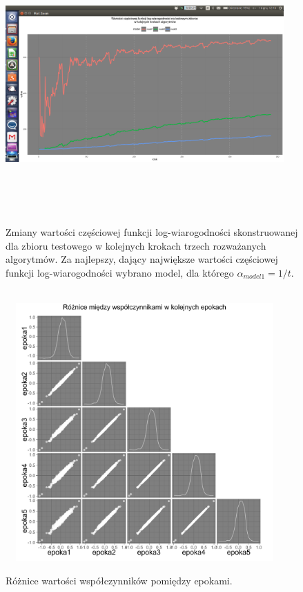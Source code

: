 \begin{figure}[!ht]
\centering
\includegraphics[width=0.95\textwidth, height = 280pt]{Obrazki/analiza/wartosci_loglik_test_ver_minus.png}
\caption{\label{wykres5} Zmiany wartości częściowej funkcji log-wiarogodności skonstruowanej dla zbioru testowego w kolejnych krokach trzech rozważanych algorytmów. Za najlepszy, dający największe wartości częściowej funkcji log-wiarogodności wybrano model, dla którego $\alpha_{model1} = 1/t$.}
\ \\
\includegraphics[width=0.95\textwidth, height = 280pt]{Obrazki/analiza/ggpairs_2.pdf}
\caption{\label{wykres6} Różnice wartości współczynników pomiędzy epokami.}
\end{figure}

